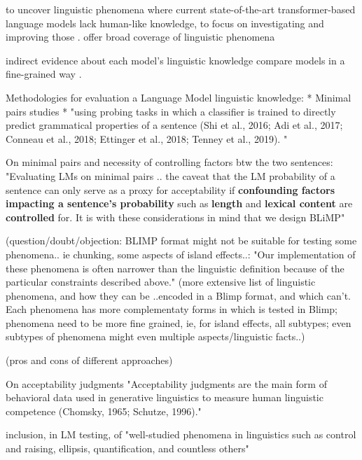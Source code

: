to uncover linguistic phenomena where current state-of-the-art transformer-based language models lack human-like knowledge, to focus on investigating and improving those  \citep{warstadt2020blimp}.
offer broad coverage of linguistic phenomena \citep{warstadt2020blimp} 

indirect evidence about each model’s linguistic knowledge \citep{warstadt2020blimp}
compare models in a fine-grained way \citep{warstadt2020blimp}.

Methodologies for evaluation a Language Model linguistic knowledge:
* Minimal pairs studies \citep{warstadt2020blimp, linzen2016assessing, marvin2018targeted, wilcox2018rnn}
* "using probing tasks in which a classifier is trained to directly predict grammatical properties of a sentence  (Shi et al., 2016; Adi et al.,
2017; Conneau et al., 2018; Ettinger et al., 2018;
Tenney et al., 2019). "  \citep{warstadt2020blimp}	

On minimal pairs and necessity of controlling factors btw the two sentences:
"Evaluating LMs on minimal pairs .. the caveat that the LM probability of a sentence can only serve as a proxy for acceptability if \textbf{confounding factors impacting a sentence’s probability} such as \textbf{length} and \textbf{lexical content} are \textbf{controlled} for. It is with these considerations in mind that we design BLiMP"

(question/doubt/objection: BLIMP format might not be suitable for testing some phenomena.. ie chunking, some aspects of island effects..: "Our implementation of these phenomena is often
narrower than the linguistic definition because of the particular constraints described above."  \citep{warstadt2020blimp}	
(more extensive list of linguistic phenomena, and how they can be ..encoded in a Blimp format, and which can't. Each phenomena has more complementaty forms in which is tested in Blimp; phenomena need to be more fine grained, ie, for island effects, all subtypes; even subtypes of phenomena might even multiple aspects/linguistic facts..)
 
(pros and cons of different approaches)


On acceptability judgments
"Acceptability judgments are the main form of
behavioral data used in generative linguistics to
measure human linguistic competence (Chomsky,
1965; Schutze, 1996)." \citep{warstadt2020blimp}	

inclusion, in LM testing, of "well-studied phenomena in linguistics such as control and
raising, ellipsis, quantification, and countless others"  \citep{warstadt2020blimp}	

